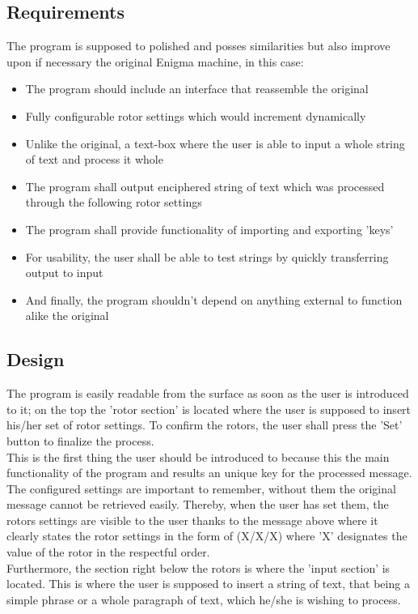 \documentclass[conference,compsoc]{IEEEtran}
\begin{document}
\subsection{Requirements}
The program is supposed to polished and posses similarities but also improve upon if necessary the original Enigma machine, in this case:
\begin{itemize}
    \item The program should include an interface that reassemble the original
    \item Fully configurable rotor settings which would increment dynamically
    \item Unlike the original, a text-box where the user is able to input a whole string of text and process it whole
    \item The program shall output enciphered string of text which was processed through the following rotor settings
    \item The program shall provide functionality of importing and exporting 'keys'
    \item For usability, the user shall be able to test strings by quickly transferring output to input
    \item And finally, the program shouldn't depend on anything external to function alike the original
\end{itemize}

\subsection{Design}
The program is easily readable from the surface as soon as the user is introduced to it; on the top the 'rotor section' is located where the user is supposed to insert his/her set of rotor settings. To confirm the rotors, the user shall press the 'Set' button to finalize the process.\\
This is the first thing the user should be introduced to because this the main functionality of the program and results an unique key for the processed message. The configured settings are important to remember, without them the original message cannot be retrieved easily. Thereby, when the user has set them, the rotors settings are visible to the user thanks to the message above where it clearly states the rotor settings in the form of (X/X/X) where 'X' designates the value of the rotor in the respectful order.\\

Furthermore, the section right below the rotors is where the 'input section' is located. This is where the user is supposed to insert a string of text, that being a simple phrase or a whole paragraph of text, which he/she is wishing to process.\\
\end{document}
